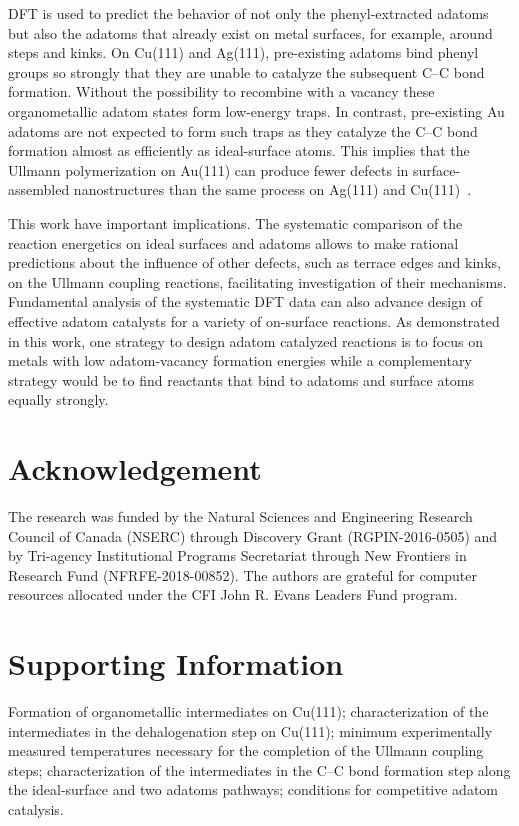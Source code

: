 \documentclass[aps,prb,amsmath,amssymb,11pt]{revtex4-1}
\newcommand*{\ACSNANO}{}
\newcommand{\sinfo}{Supporting Information}
\begin{document}
DFT is used to predict the behavior of not only the phenyl-extracted adatoms but also the adatoms that already exist on metal surfaces, for example, around steps and kinks. On Cu(111) and Ag(111), pre-existing adatoms bind phenyl groups so strongly that they are unable to catalyze the subsequent C--C bond formation. Without the possibility to recombine with a vacancy these organometallic adatom states form low-energy traps. In contrast, pre-existing Au adatoms are not expected to form such traps as they catalyze the C--C bond formation almost as efficiently as ideal-surface atoms. This implies that the Ullmann polymerization on Au(111) can produce fewer defects in surface-assembled nanostructures than the same process on Ag(111) and Cu(111)~\cite{ullmann_65}.

This work have important implications. The systematic comparison of the reaction energetics on ideal surfaces and adatoms allows to make rational predictions about the influence of other defects, such as terrace edges and kinks, on the Ullmann coupling reactions, facilitating investigation of their mechanisms.
Fundamental analysis of the systematic DFT data can also advance design of effective adatom catalysts for a variety of on-surface reactions. As demonstrated in this work, one strategy to design adatom catalyzed reactions is to focus on metals with low adatom-vacancy formation energies while a complementary strategy would be to find reactants that bind to adatoms and surface atoms equally strongly. 

\ifdefined\ACSNANO



\fi

\section*{Acknowledgement}

The research was funded by the Natural Sciences and Engineering Research Council of Canada (NSERC) through Discovery Grant (RGPIN-2016-0505) and by Tri-agency Institutional Programs Secretariat through New Frontiers in Research Fund (NFRFE-2018-00852). The authors are grateful for computer resources allocated under the CFI John R. Evans Leaders Fund program.

\section*{\sinfo}

Formation of organometallic intermediates on Cu(111); characterization of the intermediates in the dehalogenation step on Cu(111); minimum experimentally measured temperatures necessary for the completion of the Ullmann coupling steps; characterization of the intermediates in the C--C bond formation step along the ideal-surface and two adatoms pathways; conditions for competitive adatom catalysis.
\end{document}
